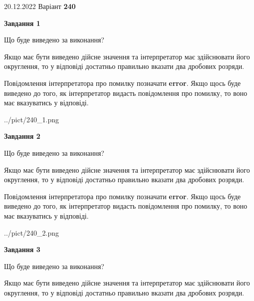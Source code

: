 \documentclass[12pt, ukrainian]{article}
\begin{document}
{20.12.2022 Варіант \No \textbf { 240 }\par}
{
\begin {Large}

{\begin {center}\textbf{Завдання 1}\end {center}}\par
Що буде виведено за виконання? \par

Якщо має бути виведено дійсне значення та інтерпретатор має здійснювати його округлення, 
то у відповіді достатньо правильно вказати два дробових розряди.

Повідомлення інтерпретатора про помилку позначати \textbf{error}.
Якщо щось буде виведено до того, як інтерпретатор видасть повідомлення про помилку, 
то воно має вказуватись у відповіді. \par

\begin{center}
	{../pict/240_1.png}
\end{center}
\newpage

{\begin {center}\textbf{Завдання 2}\end {center}}\par
Що буде виведено за виконання? \par

Якщо має бути виведено дійсне значення та інтерпретатор має здійснювати його округлення, 
то у відповіді достатньо правильно вказати два дробових розряди.

Повідомлення інтерпретатора про помилку позначати \textbf{error}.
Якщо щось буде виведено до того, як інтерпретатор видасть повідомлення про помилку, 
то воно має вказуватись у відповіді. \par

\begin{center}
	{../pict/240_2.png}
\end{center}
\newpage

{\begin {center}\textbf{Завдання 3}\end {center}}\par
Що буде виведено за виконання? \par

Якщо має бути виведено дійсне значення та інтерпретатор має здійснювати його округлення, 
то у відповіді достатньо правильно вказати два дробових розряди.


\end{Large}}
\end{document}
